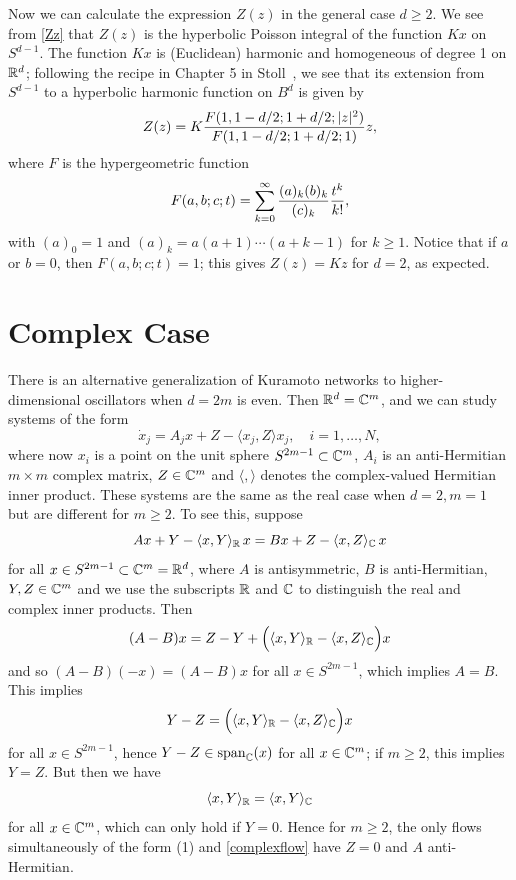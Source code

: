 \documentclass[%
 aip,
 amsmath,amssymb,
 reprint,%
]{revtex4-1}
\begin{document}
Now we can calculate the expression $Z(z)$ in the general case $d \ge 2$.  We see from \eqref{Zz} that $Z(z)$ is the hyperbolic Poisson integral of the function $Kx$ on $S^{d-1}$.  The function $Kx$ is (Euclidean) harmonic and homogeneous of degree 1 on ${\Bbb R}^d$; following the recipe in Chapter 5 in Stoll~\cite{s}, we see that its extension from $S^{d-1}$  to a hyperbolic harmonic function on $B^d$ is given by
\begin{equation}
Z(z) = K  {F(1, 1-d/2; 1+d/2; |z|^2) \over  F(1, 1-d/2; 1+d/2; 1) }z, 
\label{Zevaluated}
\end{equation}
where $F$ is the hypergeometric function
$$
F(a, b; c; t) = \sum_{k=0}^\infty { (a)_k (b)_k \over (c)_k } {t^k \over k!},
$$
with $(a)_0 = 1$ and $(a)_k = a(a+1) \cdots (a+k-1)$ for $k \ge 1$.  Notice that if $a$ or $b = 0$, then $F(a, b;c;t) = 1$; this gives $Z(z) = Kz$ for $d=2$, as expected.
\section{\label{sec:level1}Complex Case}
There is an alternative generalization of Kuramoto networks to higher-dimensional oscillators when $d = 2m $ is even.  Then ${\Bbb R}^d = {\Bbb C}^m$, and we can study systems of the form
\begin{equation}
 \dot x_j = A_jx + Z - \langle  x_j , Z \rangle x_j, \quad i = 1, \dots, N,
\label{complexflow}
\end{equation}
 where now $x_i $ is a point on the unit sphere $S^{2m-1} \subset {\Bbb C}^m$, $A_i$ is an anti-Hermitian $m \times m$ complex matrix, $Z \in {\Bbb C}^m$ and $\langle, \rangle$ denotes the complex-valued Hermitian inner product.  These systems are the same as the real case when $d=2, m=1$ but are different for $m \ge 2$.  To see this, suppose
$$
 Ax +Y - \langle x, Y\rangle_{\Bbb R} \, x = Bx + Z - \langle x, Z \rangle_{\Bbb C} \, x
 $$
for all $x \in S^{2m-1} \subset {\Bbb C}^m = {\Bbb R}^d$, where $A$ is antisymmetric, $B$ is anti-Hermitian, $Y, Z \in {\Bbb C}^m$ and we use the subscripts $\Bbb R$ and $\Bbb C$ to distinguish the real and complex inner products.  Then
 $$
(A-B)x = Z-Y + \Bigl(  \langle x, Y\rangle_{\Bbb R} -  \langle x, Z \rangle_{\Bbb C} \Bigr ) x
$$
and so $(A-B)(-x) = (A-B) x$ for all  $x \in S^{2m-1}$, which implies $A = B$. This implies
$$
Y-Z =  \Bigl (\langle x, Y\rangle_{\Bbb R} - \langle x, Z \rangle_{\Bbb C} \Bigr ) x
$$
for all $x \in S^{2m-1}$, hence $Y-Z \in {\rm span}_{\Bbb C} (x)$ for all $x \in {\Bbb C}^m$; if $m \ge 2$, this implies $Y = Z$.  But then we have
$$
\langle x, Y\rangle_{\Bbb R} = \langle x, Y \rangle_{\Bbb C}
$$
for all $x \in {\Bbb C}^m$, which can only hold if $Y = 0$.  Hence for $m \ge 2$, the only flows simultaneously of the form (1) and \eqref{complexflow} have $Z = 0$ and $A$ anti-Hermitian.
\end{document}
